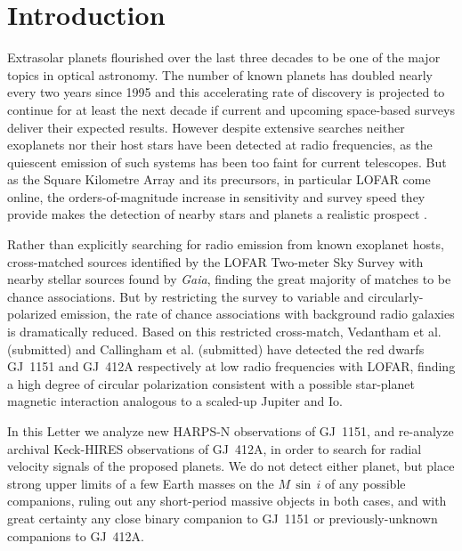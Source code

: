 \documentclass[modern]{aastex62}
\newcommand{\gaia}{\textit{Gaia}\xspace}
\begin{document}


\section{Introduction} 
\label{sec:intro}

Extrasolar planets flourished over the last three decades to be one of the major topics in optical astronomy. The number of known planets has doubled nearly every two years since 1995 \citep{Mamajek2016} and this accelerating rate of discovery is projected to continue for at least the next decade if current and upcoming space-based surveys deliver their expected results. However despite extensive searches \citep{2000ApJ...545.1058B,2013A&A...552A..65L,2018MNRAS.tmp.1077L} neither exoplanets nor their host stars have been detected at radio frequencies, as the quiescent emission of such systems has been too faint for current telescopes. But as the Square Kilometre Array \citep[SKA;][]{2009IEEEP..97.1482D} and its precursors, in particular LOFAR \citep[the LOw-Frequency ARray:][]{lofar} come online, the orders-of-magnitude increase in sensitivity and survey speed they provide makes the detection of nearby stars and planets a realistic prospect \citep{pope19}. 

Rather than explicitly searching for radio emission from known exoplanet hosts, \citet{Callingham_2019} cross-matched sources identified by the LOFAR Two-meter Sky Survey \citep[LoTSS:][]{lotss} with nearby stellar sources found by \gaia, finding the great majority of matches to be chance associations. But by restricting the survey to variable and circularly-polarized emission, the rate of chance associations with background radio galaxies is dramatically reduced. Based on this restricted cross-match, Vedantham et al. (submitted) and Callingham et al. (submitted) have detected the red dwarfs GJ~1151 and GJ~412A \citep[M1.0:][]{} respectively at low radio frequencies with LOFAR, finding a high degree of circular polarization consistent with a possible star-planet magnetic interaction analogous to a scaled-up Jupiter and Io. 

In this Letter we analyze new HARPS-N \citep[High Accuracy Radial velocity Planet Searcher:][]{harpsn} observations of GJ~1151, and re-analyze archival Keck-HIRES \citep{hires} observations of GJ~412A, in order to search for radial velocity signals of the proposed planets. We do not detect either planet, but place strong upper limits of a few Earth masses on the $M\,\sin\,{i}$ of any possible companions, ruling out any short-period massive objects in both cases, and with great certainty any close binary companion to GJ~1151 or previously-unknown companions to GJ~412A.  
\end{document}
